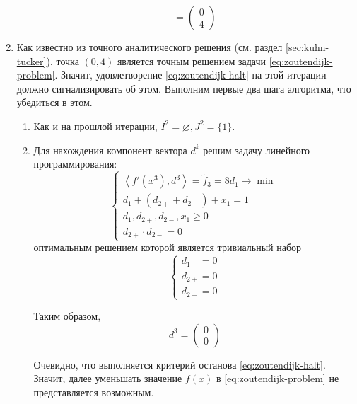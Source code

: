 \documentclass{article}
\renewcommand{\geq}{\geqslant}
\newcommand{\mul}{\cdot}
\newcommand{\scalmult}[1]{{\left \langle #1 \right \rangle}}
\theoremstyle{remark}
\theoremstyle{definition}
\numberwithin{equation}{section}
\begin{document}
\begin{enumerate}
\begin{enumerate}
\begin{equation*}
      = \begin{pmatrix} 0 \\ 4 \end{pmatrix}
    \end{equation*}
  \end{enumerate}
\item Как известно из точного аналитического решения (см. раздел
  \ref{sec:kuhn-tucker}), точка $(0, 4)$ является точным решением
  задачи \eqref{eq:zoutendijk-problem}. Значит, удовлетворение
  \eqref{eq:zoutendijk-halt} на этой итерации должно сигнализировать
  об этом. Выполним первые два шага алгоритма, что убедиться в этом.
  \begin{enumerate}
  \item Как и на прошлой итерации, $I^2 = \varnothing, J^2 = \{1\}$.
  \item Для нахождения компонент вектора $d^k$ решим задачу линейного
    программирования:
    \begin{equation*}
      \begin{cases}
        \scalmult{f'(x^3), d^3} = \tilde{f}_3 =
        8d_1 \to \min \\
        d_1+(d_{2+}+d_{2-}) + x_1 = 1 \\
        d_1, d_{2+}, d_{2-}, x_1 \geq 0 \\
        d_{2+} \mul d_{2-} = 0
      \end{cases}
    \end{equation*}
    оптимальным решением которой является тривиальный набор
    \begin{equation*}
      \begin{cases}
        d_{1\phantom{+}} = 0 \\
        d_{2+} = 0 \\
        d_{2-} = 0
      \end{cases}
    \end{equation*}

    Таким образом,
    \begin{equation*}
      d^3 = \begin{pmatrix} 0 \\ 0 \end{pmatrix}
    \end{equation*}

    Очевидно, что выполняется критерий останова
    \eqref{eq:zoutendijk-halt}. Значит, далее уменьшать значение
    $f(x)$ в \eqref{eq:zoutendijk-problem} не представляется
    возможным.
  \end{enumerate}
\end{enumerate}
\end{document}
